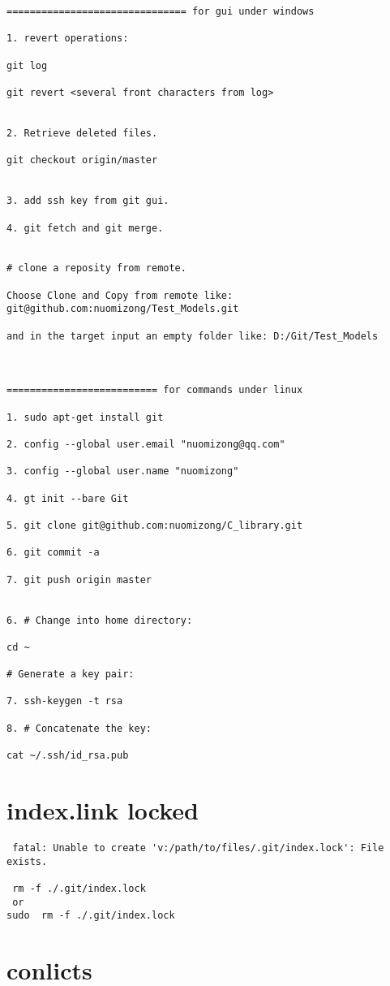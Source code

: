 \documentclass[10pt,a4paper]{article}
\begin{document}
\begin{lstlisting}
=============================== for gui under windows

1. revert operations:

git log

git revert <several front characters from log>


2. Retrieve deleted files.

git checkout origin/master


3. add ssh key from git gui.

4. git fetch and git merge.


# clone a reposity from remote.

Choose Clone and Copy from remote like: git@github.com:nuomizong/Test_Models.git

and in the target input an empty folder like: D:/Git/Test_Models



========================== for commands under linux

1. sudo apt-get install git

2. config --global user.email "nuomizong@qq.com"

3. config --global user.name "nuomizong"

4. gt init --bare Git

5. git clone git@github.com:nuomizong/C_library.git

6. git commit -a

7. git push origin master


6. # Change into home directory:

cd ~

# Generate a key pair:

7. ssh-keygen -t rsa

8. # Concatenate the key:

cat ~/.ssh/id_rsa.pub
\end{lstlisting}

\section{index.link locked}
\begin{lstlisting}
 fatal: Unable to create 'v:/path/to/files/.git/index.lock': File exists.
 
 rm -f ./.git/index.lock
 or
sudo  rm -f ./.git/index.lock
\end{lstlisting}

\section{conlicts}
\end{document}
